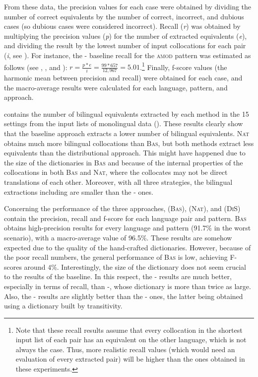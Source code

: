 \documentclass[output=paper
,modfonts
,nonflat]{langsci/langscibook}
\begin{document}
From these data, the precision values for each case were obtained by dividing the number of
correct  equivalents by the number of correct, incorrect, and dubious cases (so dubious
cases were considered incorrect). Recall (\textit{r}) was obtained by multiplying the precision values (\textit{p})
for the number of extracted equivalents (\textit{e}), and dividing the result by the lowest number of input collocations
for each pair (\textit{i}, see ). For instance, the - baseline recall for the \textsc{amod}
pattern was estimated as follows (see , , and ):
$r = \frac{p * e}{i} = \frac{99 * 657}{12,967} = 5.01$.\footnote{Note that these recall results assume that
  every collocation in the shortest input list of each pair has an equivalent on the other language,
  which is not always the case. Thus, more realistic recall values (which would need an
  evaluation of every extracted pair) will be higher than the ones obtained in these experiments.}
Finally, f-score values (the harmonic mean between precision and recall) were obtained
for each case, and the macro-average results were calculated for each language, pattern, and approach.

 contains the number of bilingual  equivalents extracted by
each method in the 15 settings from the input lists of monolingual data ().
These results clearly show that the baseline approach extracts a lower number of bilingual equivalents.
\textsc{Nat} obtains much more bilingual collocations than \textsc{Bas}, but both methods
extract less equivalents than the distributional approach. This might have happened due to the
size of the dictionaries in \textsc{Bas} and because of the internal properties of the collocations
in both \textsc{Bas} and \textsc{Nat}, where the collocates may not be direct translations
of each other. Moreover, with all three strategies, the bilingual extractions
including  are smaller than the - ones.

Concerning the performance of the three approaches,  (\textsc{Bas}),
 (\textsc{Nat}), and  (\textsc{DiS}) contain the precision,
recall and f-score for each language pair and  pattern.
\textsc{Bas} obtains high-precision results for every language and 
pattern (91.7\% in the worst scenario), with a macro-average value of 96.5\%. These
results are somehow expected due to the quality of the hand-crafted dictionaries. However,
because of the poor recall numbers, the general performance of \textsc{Bas} is low,
achieving F-scores around $4\%$. Interestingly, the size of the dictionary
does not seem crucial to the results of the baseline. In this respect, the
- results are much better, especially in terms of recall, than -, whose
dictionary is more than twice as large. Also, the - results are slightly
better than the - ones, the latter being obtained using a dictionary
built by transitivity.
\end{document}
